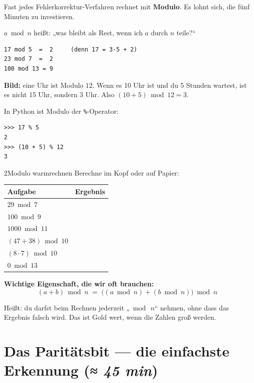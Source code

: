 Fast jedes Fehlerkorrektur-Verfahren rechnet mit \textbf{Modulo}. Es
lohnt sich, die fünf Minuten zu investieren.

$a \bmod n$ heißt: „was bleibt als Rest, wenn ich $a$ durch $n$ teile?“

\begin{verbatim}
17 mod 5  =  2     (denn 17 = 3·5 + 2)
23 mod 7  =  2
100 mod 13 = 9
\end{verbatim}

\textbf{Bild:} eine Uhr ist Modulo $12$. Wenn es 10 Uhr ist und du 5
Stunden wartest, ist es nicht 15 Uhr, sondern 3 Uhr. Also
$(10 + 5) \bmod 12 = 3$.

In Python ist Modulo der \texttt{\%}-Operator:

\begin{verbatim}
>>> 17 % 5
2
>>> (10 + 5) % 12
3
\end{verbatim}

\begin{bleistiftuebung}{2}{Modulo warmrechnen}
Berechne im Kopf oder auf Papier:

\begin{center}
\begin{tabular}{lc}
  \toprule
  Aufgabe & Ergebnis \\
  \midrule
  $29 \bmod 7$        & \\
  $100 \bmod 9$       & \\
  $1000 \bmod 11$     & \\
  $(47 + 38) \bmod 10$ & \\
  $(8 \cdot 7) \bmod 10$ & \\
  $0 \bmod 13$        & \\
  \bottomrule
\end{tabular}
\end{center}
\end{bleistiftuebung}

\textbf{Wichtige Eigenschaft, die wir oft brauchen:}
\[
  (a + b) \bmod n \;=\; \big((a \bmod n) + (b \bmod n)\big) \bmod n
\]

Heißt: du darfst beim Rechnen jederzeit „$\bmod\, n$“ nehmen, ohne
dass das Ergebnis falsch wird. Das ist Gold wert, wenn die Zahlen
groß werden.

\section{Das Paritätsbit — die einfachste Erkennung \normalfont(\textit{≈ 45 min})}

